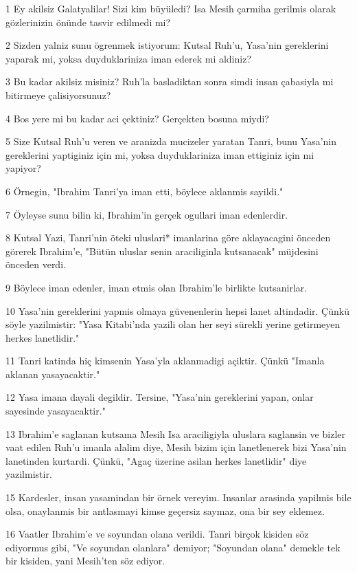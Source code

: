 \par 1 Ey akilsiz Galatyalilar! Sizi kim büyüledi? Isa Mesih çarmiha gerilmis olarak gözlerinizin önünde tasvir edilmedi mi?
\par 2 Sizden yalniz sunu ögrenmek istiyorum: Kutsal Ruh'u, Yasa'nin gereklerini yaparak mi, yoksa duyduklariniza iman ederek mi aldiniz?
\par 3 Bu kadar akilsiz misiniz? Ruh'la basladiktan sonra simdi insan çabasiyla mi bitirmeye çalisiyorsunuz?
\par 4 Bos yere mi bu kadar aci çektiniz? Gerçekten bosuna miydi?
\par 5 Size Kutsal Ruh'u veren ve aranizda mucizeler yaratan Tanri, bunu Yasa'nin gereklerini yaptiginiz için mi, yoksa duyduklariniza iman ettiginiz için mi yapiyor?
\par 6 Örnegin, "Ibrahim Tanri'ya iman etti, böylece aklanmis sayildi."
\par 7 Öyleyse sunu bilin ki, Ibrahim'in gerçek ogullari iman edenlerdir.
\par 8 Kutsal Yazi, Tanri'nin öteki uluslari* imanlarina göre aklayacagini önceden görerek Ibrahim'e, "Bütün uluslar senin araciliginla kutsanacak" müjdesini önceden verdi.
\par 9 Böylece iman edenler, iman etmis olan Ibrahim'le birlikte kutsanirlar.
\par 10 Yasa'nin gereklerini yapmis olmaya güvenenlerin hepsi lanet altindadir. Çünkü söyle yazilmistir: "Yasa Kitabi'nda yazili olan her seyi sürekli yerine getirmeyen herkes lanetlidir."
\par 11 Tanri katinda hiç kimsenin Yasa'yla aklanmadigi açiktir. Çünkü "Imanla aklanan yasayacaktir."
\par 12 Yasa imana dayali degildir. Tersine, "Yasa'nin gereklerini yapan, onlar sayesinde yasayacaktir."
\par 13 Ibrahim'e saglanan kutsama Mesih Isa araciligiyla uluslara saglansin ve bizler vaat edilen Ruh'u imanla alalim diye, Mesih bizim için lanetlenerek bizi Yasa'nin lanetinden kurtardi. Çünkü, "Agaç üzerine asilan herkes lanetlidir" diye yazilmistir.
\par 15 Kardesler, insan yasamindan bir örnek vereyim. Insanlar arasinda yapilmis bile olsa, onaylanmis bir antlasmayi kimse geçersiz saymaz, ona bir sey eklemez.
\par 16 Vaatler Ibrahim'e ve soyundan olana verildi. Tanri birçok kisiden söz ediyormus gibi, "Ve soyundan olanlara" demiyor; "Soyundan olana" demekle tek bir kisiden, yani Mesih'ten söz ediyor.
